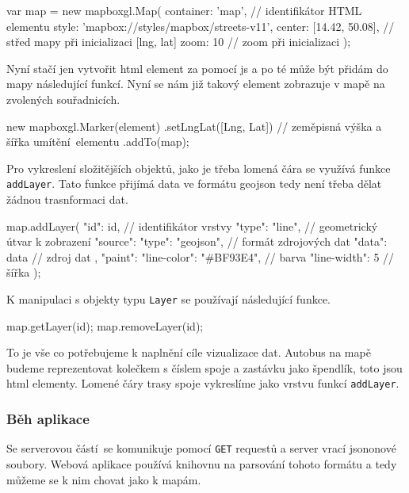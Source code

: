 \begin{code}[frame=none]
var map = new mapboxgl.Map({
  container: 'map', // identifikátor HTML elementu
  style: 'mapbox://styles/mapbox/streets-v11',
  center: [14.42, 50.08], // střed mapy při inicializaci [lng, lat]
    zoom: 10 // zoom při inicializaci
});
\end{code}

Nyní stačí jen vytvořit \gls{html} element za pomocí \gls{js} a po té může být přidám do mapy následující funkcí. Nyní se nám již takový element zobrazuje v mapě na zvolených souřadnicích.

\begin{code}[frame=none]
new mapboxgl.Marker(element)
  .setLngLat([Lng, Lat]) // zeměpisná výška a šířka
    umítění elementu
  .addTo(map);
\end{code}

Pro vykreslení složitějších objektů, jako je třeba lomená čára se využívá funkce \verb-addLayer-. Tato funkce přijímá data ve formátu \gls{geojson} tedy není třeba dělat žádnou trasnformaci dat.

\begin{code}[frame=none]
map.addLayer({
  "id": id, // identifikátor vrstvy
  "type": "line", // geometrický útvar k zobrazení
  "source": {
    "type": "geojson", // formát zdrojových dat
    "data": data // zdroj dat
  },
  "paint": {
    "line-color": "#BF93E4", // barva
    "line-width": 5 // šířka
  }
});
\end{code}

K manipulaci s objekty typu \verb-Layer- se používají následující funkce.

\begin{code}[frame=none]
map.getLayer(id);
map.removeLayer(id);
\end{code}

To je vše co potřebujeme k naplnění cíle vizualizace dat. Autobus na mapě budeme reprezentovat kolečkem s číslem spoje a zastávku jako špendlík, toto jsou \gls{html} elementy. Lomené čáry trasy spoje vykreslíme jako vrstvu funkcí \verb-addLayer-.

\subsubsection{Běh aplikace}

Se serverovou částí se komunikuje pomocí \verb-GET- requestů a server vrací \gls{json}onové soubory. Webová aplikace používá knihovnu na parsování tohoto formátu a tedy můžeme se k nim chovat jako k mapám.

